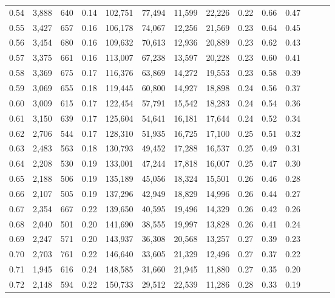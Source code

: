\begin{tabular}{rrrrrrrrrrrrrr}
0.54 &  3,888 &  640 &  0.14 &  102,751 &   77,494 &  11,599 &  22,226 &  0.22 &  0.66 &      0.47 \\
0.55 &  3,427 &  657 &  0.16 &  106,178 &   74,067 &  12,256 &  21,569 &  0.23 &  0.64 &      0.45 \\
0.56 &  3,454 &  680 &  0.16 &  109,632 &   70,613 &  12,936 &  20,889 &  0.23 &  0.62 &      0.43 \\
0.57 &  3,375 &  661 &  0.16 &  113,007 &   67,238 &  13,597 &  20,228 &  0.23 &  0.60 &      0.41 \\
0.58 &  3,369 &  675 &  0.17 &  116,376 &   63,869 &  14,272 &  19,553 &  0.23 &  0.58 &      0.39 \\
0.59 &  3,069 &  655 &  0.18 &  119,445 &   60,800 &  14,927 &  18,898 &  0.24 &  0.56 &      0.37 \\
0.60 &  3,009 &  615 &  0.17 &  122,454 &   57,791 &  15,542 &  18,283 &  0.24 &  0.54 &      0.36 \\
0.61 &  3,150 &  639 &  0.17 &  125,604 &   54,641 &  16,181 &  17,644 &  0.24 &  0.52 &      0.34 \\
0.62 &  2,706 &  544 &  0.17 &  128,310 &   51,935 &  16,725 &  17,100 &  0.25 &  0.51 &      0.32 \\
0.63 &  2,483 &  563 &  0.18 &  130,793 &   49,452 &  17,288 &  16,537 &  0.25 &  0.49 &      0.31 \\
0.64 &  2,208 &  530 &  0.19 &  133,001 &   47,244 &  17,818 &  16,007 &  0.25 &  0.47 &      0.30 \\
0.65 &  2,188 &  506 &  0.19 &  135,189 &   45,056 &  18,324 &  15,501 &  0.26 &  0.46 &      0.28 \\
0.66 &  2,107 &  505 &  0.19 &  137,296 &   42,949 &  18,829 &  14,996 &  0.26 &  0.44 &      0.27 \\
0.67 &  2,354 &  667 &  0.22 &  139,650 &   40,595 &  19,496 &  14,329 &  0.26 &  0.42 &      0.26 \\
0.68 &  2,040 &  501 &  0.20 &  141,690 &   38,555 &  19,997 &  13,828 &  0.26 &  0.41 &      0.24 \\
0.69 &  2,247 &  571 &  0.20 &  143,937 &   36,308 &  20,568 &  13,257 &  0.27 &  0.39 &      0.23 \\
0.70 &  2,703 &  761 &  0.22 &  146,640 &   33,605 &  21,329 &  12,496 &  0.27 &  0.37 &      0.22 \\
0.71 &  1,945 &  616 &  0.24 &  148,585 &   31,660 &  21,945 &  11,880 &  0.27 &  0.35 &      0.20 \\
0.72 &  2,148 &  594 &  0.22 &  150,733 &   29,512 &  22,539 &  11,286 &  0.28 &  0.33 &      0.19 \\

\end{tabular}
